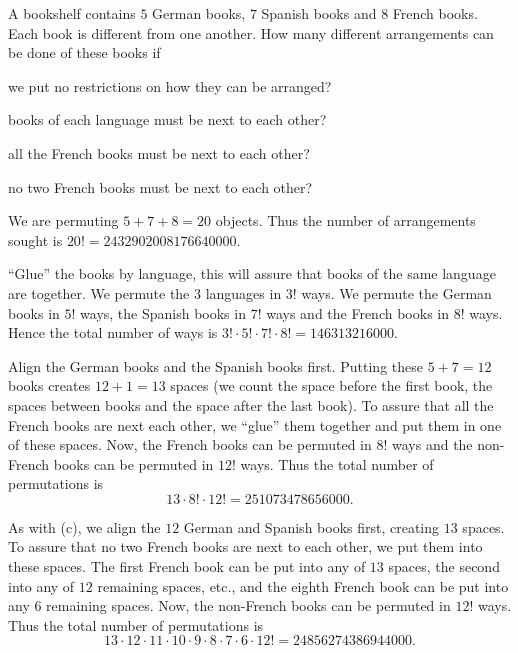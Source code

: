 \begin{exa}
A bookshelf contains $5$ German books, $7$ Spanish books and $8$
French books. Each book is different from one another.
How many different arrangements can be done of these books if
\begin{lenum}
\item  we put no restrictions on how they can be arranged?
\item  books of each language must be next to each other? 
\item all the French books must be next to each other? 
\item no two French books must be next to each other?
\end{lenum}
\begin{sol}
\begin{lenum} \item We are permuting $5 + 7 + 8 = 20$ objects. Thus the number
of arrangements sought is $20! = 2432902008176640000$. \item
``Glue'' the books by language, this will assure that books of the
same language are together. We permute the $3$ languages in $3!$
ways. We permute the German books in $5!$ ways, the Spanish books in
$7!$ ways and the French books in $8!$ ways. Hence the total number
of ways is $3!\cdot 5!\cdot 7!\cdot 8! = 146313216000$. 
\item 
Align the German books
and the Spanish books first. Putting these $5 + 7 = 12$ books
creates $12 + 1 = 13$ spaces (we count the space before the first
book, the spaces between books and the space after the last book).
To assure that all the French books are next each other, we ``glue''
them together and put them in one of these spaces.  Now, the French
books can be permuted in $8!$ ways and the non-French books can be
permuted in $12!$ ways. Thus the total number of permutations is
$$ 13\cdot 8!\cdot 12! =  251073478656000.$$
\item 
As with (c), we align the $12$ German and Spanish books first,
creating $13$ spaces. To assure that no two French books are next to
each other, we put them into these spaces. The first French book can
be put into any of $13$ spaces, the second into any of $12$ remaining spaces, etc.,
and the eighth French book can be put into any $6$ remaining spaces. Now, the
non-French books can be permuted in  $12!$ ways. Thus the total
number of permutations is
$$ 13\cdot 12\cdot 11\cdot 10\cdot 9\cdot 8\cdot 7\cdot 6\cdot 12!=24856274386944000.$$
\end{lenum}
\end{sol}
\end{exa}



